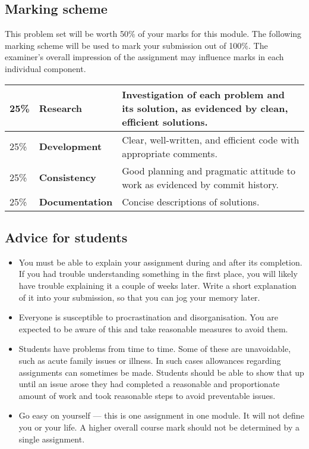 \documentclass[a4paper, 12pt]{exam}
\begin{document}
\subsection*{Marking scheme}
  This problem set will be worth 50\% of your marks for this module.
  The following marking scheme will be used to mark your submission out of 100\%.
  The examiner's overall impression of the assignment may influence marks in each individual component.

  \begin{center}
    \begin{tabular}{llp{8.4cm}}
      \toprule
      25\% & \textbf{Research} & Investigation of each problem and its solution, as evidenced by clean, efficient solutions. \\
      \midrule
      25\% & \textbf{Development} & Clear, well-written, and efficient code with appropriate comments. \\
      \midrule
      25\% & \textbf{Consistency} & Good planning and pragmatic attitude to work as evidenced by commit history. \\
      \midrule
      25\% & \textbf{Documentation} & Concise descriptions of solutions. \\
      \bottomrule
    \end{tabular}
  \end{center}

  \subsection*{Advice for students}
  \begin{itemize}
    \item
      You must be able to explain your assignment during and after its completion.
      If you had trouble understanding something in the first place, you will likely have trouble explaining it a couple of weeks later.
      Write a short explanation of it into your submission, so that you can jog your memory later.
    \item
      Everyone is susceptible to procrastination and disorganisation.
      You are expected to be aware of this and take reasonable measures to avoid them.
    \item
      Students have problems from time to time.
      Some of these are unavoidable, such as acute family issues or illness.
      In such cases allowances regarding assignments can sometimes be made.
      Students should be able to show that up until an issue arose they had completed a reasonable and proportionate amount of work and took reasonable steps to avoid preventable issues.
    \item
      Go easy on yourself --- this is one assignment in one module.
      It will not define you or your life.
      A higher overall course mark should not be determined by a single assignment.
  \end{itemize}
\end{document}
